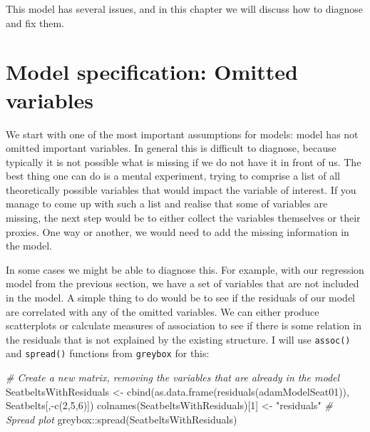 \documentclass[
]{book}
\newenvironment{Shaded}{\begin{snugshade}}{\end{snugshade}}
\newcommand{\CommentTok}[1]{\textcolor[rgb]{0.56,0.35,0.01}{\textit{#1}}}
\newcommand{\DecValTok}[1]{\textcolor[rgb]{0.00,0.00,0.81}{#1}}
\newcommand{\FunctionTok}[1]{\textcolor[rgb]{0.00,0.00,0.00}{#1}}
\newcommand{\NormalTok}[1]{#1}
\newcommand{\OtherTok}[1]{\textcolor[rgb]{0.56,0.35,0.01}{#1}}
\newcommand{\SpecialCharTok}[1]{\textcolor[rgb]{0.00,0.00,0.00}{#1}}
\newcommand{\StringTok}[1]{\textcolor[rgb]{0.31,0.60,0.02}{#1}}
\theoremstyle{definition}
\theoremstyle{definition}
\theoremstyle{definition}
\theoremstyle{definition}
\theoremstyle{remark}
\begin{document}
This model has several issues, and in this chapter we will discuss how to diagnose and fix them.

\hypertarget{diagnosticsOmitted}{%
\section{Model specification: Omitted variables}\label{diagnosticsOmitted}}

We start with one of the most important assumptions for models: model has not omitted important variables. In general this is difficult to diagnose, because typically it is not possible what is missing if we do not have it in front of us. The best thing one can do is a mental experiment, trying to comprise a list of all theoretically possible variables that would impact the variable of interest. If you manage to come up with such a list and realise that some of variables are missing, the next step would be to either collect the variables themselves or their proxies. One way or another, we would need to add the missing information in the model.

In some cases we might be able to diagnose this. For example, with our regression model from the previous section, we have a set of variables that are not included in the model. A simple thing to do would be to see if the residuals of our model are correlated with any of the omitted variables. We can either produce scatterplots or calculate measures of association to see if there is some relation in the residuals that is not explained by the existing structure. I will use \texttt{assoc()} and \texttt{spread()} functions from \texttt{greybox} for this:

\begin{Shaded}
\begin{Highlighting}[]
\CommentTok{\# Create a new matrix, removing the variables that are already in the model}
\NormalTok{SeatbeltsWithResiduals }\OtherTok{\textless{}{-}}
  \FunctionTok{cbind}\NormalTok{(}\FunctionTok{as.data.frame}\NormalTok{(}\FunctionTok{residuals}\NormalTok{(adamModelSeat01)),}
\NormalTok{        Seatbelts[,}\SpecialCharTok{{-}}\FunctionTok{c}\NormalTok{(}\DecValTok{2}\NormalTok{,}\DecValTok{5}\NormalTok{,}\DecValTok{6}\NormalTok{)])}
\FunctionTok{colnames}\NormalTok{(SeatbeltsWithResiduals)[}\DecValTok{1}\NormalTok{] }\OtherTok{\textless{}{-}} \StringTok{"residuals"}
\CommentTok{\# Spread plot}
\NormalTok{greybox}\SpecialCharTok{::}\FunctionTok{spread}\NormalTok{(SeatbeltsWithResiduals)}
\end{Highlighting}
\end{Shaded}
\end{document}
